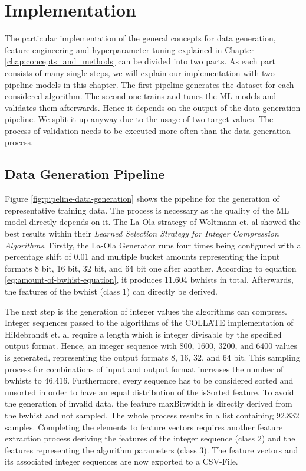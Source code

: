 \chapter{Implementation}
The particular implementation of the general concepts for data generation, feature engineering and hyperparameter tuning explained in Chapter \ref{chap:concepts_and_methods} can be divided into two parts. As each part consists of many single steps, we will explain our implementation with two pipeline models in this chapter. The first pipeline generates the dataset for each considered algorithm. The second one trains and tunes the ML models and validates them afterwards. Hence it depends on the output of the data generation pipeline. We split it up anyway due to the usage of two target values. The process of validation needs to be executed more often than the data generation process. 
\section{Data Generation Pipeline}
\label{ch:data_gen_pipe}
Figure \ref{fig:pipeline-data-generation} shows the pipeline for the generation of representative training data. The process is necessary as the quality of the ML model directly depends on it. The La-Ola strategy of Woltmann et. al \cite{Woltmann2021} showed the best results within their \emph{Learned Selection Strategy for Integer Compression Algorithms}. Firstly, the La-Ola Generator runs four times being configured with a percentage shift of 0.01 and multiple bucket amounts representing the input formats 8 bit, 16 bit, 32 bit, and 64 bit one after another. According to equation \ref{eq:amount-of-bwhist-equation}, it produces 11.604 bwhists in total. Afterwards, the features of the bwhist (class 1) can directly be derived.

The next step is the generation of integer values the algorithms can compress. Integer sequences passed to the algorithms of the COLLATE implementation of Hildebrandt et. al \cite{Hildebrandt2017} require a length which is integer divisable by the specified output format. Hence, an integer sequence with 800, 1600, 3200, and 6400 values is generated, representing the output formats 8, 16, 32, and 64 bit. This sampling process for combinations of input and output format increases the number of bwhists to 46.416. Furthermore, every sequence has to be considered sorted and unsorted in order to have an equal distribution of the isSorted feature. To avoid the generation of invalid data, the feature maxBitwidth is directly derived from the bwhist and not sampled. The whole process results in a list containing 92.832 samples. Completing the elements to feature vectors requires another feature extraction process deriving the features of the integer sequence (class 2) and the features representing the algorithm parameters (class 3). The feature vectors and its associated integer sequences are now exported to a CSV-File.

